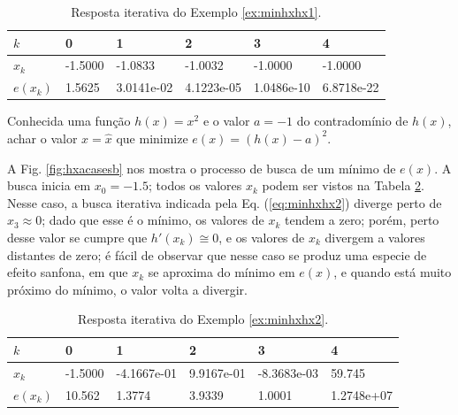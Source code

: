 \begin{table}[!h]
\centering
\begin{tabular}{|l|l|l|l|l|l|}
\hline
$k$      & 0 & 1 & 2 & 3 & 4 \\ \hline
$x_k$    & -1.5000 & -1.0833 & -1.0032 & -1.0000 & -1.0000 \\ \hline
$e(x_k)$ & 1.5625 & 3.0141e-02 & 4.1223e-05 & 1.0486e-10 & 6.8718e-22 \\ \hline
\end{tabular}
\caption{Resposta iterativa do Exemplo \ref{ex:minhxhx1}.}
\label{tab:hxacases1}
\end{table}

\begin{example}\label{ex:minhxhx2}
Conhecida uma função $h(x)=x^2$ e o valor $a=-1$ do contradomínio de $h(x)$,
achar o valor $x=\hat{x}$ que minimize $e(x)=(h(x)-a)^2$.
\end{example}


\begin{SolutionT}\label{sol:minhxhx2}
A Fig. \ref{fig:hxacasesb} nos mostra o processo de busca de um mínimo de $e(x)$. 
A busca inicia em $x_0=-1.5$;
 todos os valores $x_{k}$ podem ser vistos na Tabela \ref{tab:hxacases2}. 
Nesse caso, a busca iterativa indicada pela Eq. (\ref{eq:minhxhx2}) diverge 
perto de $x_3\approx 0$; dado que esse é o mínimo,
 os valores de $x_{k}$ tendem a zero; porém,
perto desse valor se cumpre que $h'(x_{k})\cong 0$, e os valores de $x_{k}$ divergem
a valores distantes de zero; é fácil de observar que nesse caso se produz 
uma especie de efeito sanfona, em que $x_{k}$ se aproxima do mínimo em $e(x)$, e quando 
está muito próximo do mínimo, o valor volta a divergir.
\end{SolutionT}

\begin{table}[!h]
\centering
\begin{tabular}{|l|l|l|l|l|l|}
\hline
$k$      & 0 & 1 & 2 & 3 & 4 \\ \hline
$x_k$    & -1.5000 & -4.1667e-01 & 9.9167e-01 & -8.3683e-03 & 59.745 \\ \hline
$e(x_k)$ & 10.562 & 1.3774 & 3.9339 & 1.0001 & 1.2748e+07 \\ \hline
\end{tabular}
\caption{Resposta iterativa do Exemplo \ref{ex:minhxhx2}.}
\label{tab:hxacases2}
\end{table}

